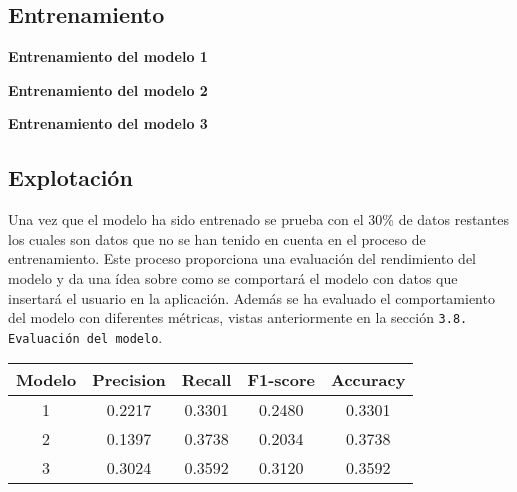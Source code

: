 \subsection{Entrenamiento}

\textbf{Entrenamiento del modelo 1}


\textbf{Entrenamiento del modelo 2}


\textbf{Entrenamiento del modelo 3}


\subsection{Explotación}

Una vez que el modelo ha sido entrenado se prueba con el 30\% de datos restantes los cuales son datos que no se han tenido en cuenta en el proceso de entrenamiento. Este proceso proporciona una evaluación del rendimiento del modelo y da una ídea sobre como se comportará el modelo con datos que insertará el usuario en la aplicación.
Además se ha evaluado el comportamiento del modelo con diferentes métricas, vistas anteriormente en la sección \texttt{3.8. Evaluación del modelo}.

\begin{tabular}{|c|c|c|c|c|}
\hline
Modelo & Precision & Recall & F1-score & Accuracy \\
\hline
1 & 0.2217 & 0.3301 & 0.2480 & 0.3301 \\
2 & 0.1397 & 0.3738 & 0.2034 & 0.3738 \\
3  & 0.3024 & 0.3592 & 0.3120 & 0.3592 \\
\hline
\end{tabular}
